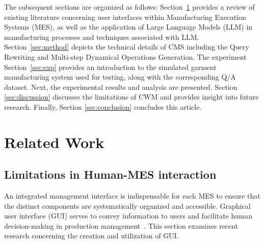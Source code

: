 \documentclass[preprint,12pt]{elsarticle}
\begin{document}
The subsequent sections are organized as follows:
Section~\ref{sec:related_work} provides a review of existing literature concerning user interfaces within Manufacturing Execution Systems (MES), as well as the application of Large Language Models (LLM) in manufacturing processes and techniques associated with LLM.
Section~\ref{sec:method} depicts the technical details of CMS including the Query Rewriting and Multi-step Dynamical Operations Generation.
The experiment Section~\ref{sec:exp} provides an introduction to the simulated garment manufacturing system used for testing, along with the corresponding Q/A dataset.
Next, the experimental results and analysis are presented.
Section \ref{sec:discussion} discusses the limitations of CWM and provides insight into future research. 
Finally, Section \ref{sec:conclusion} concludes this article.


\section{Related Work}
\label{sec:related_work}
\subsection{Limitations in Human-MES interaction}
An integrated management interface is indispensable for each MES to ensure that the distinct components are systematically organized and accessible.
Graphical user interface (GUI) serves to convey information to users and facilitate human decision-making in production management~\cite{SHOJAEINASAB2022503}. 
This section examines recent research concerning the creation and utilization of GUI. 
\end{document}
